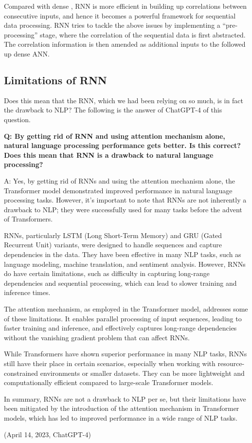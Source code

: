 Compared with dense , RNN is more efficient in building up correlations between consecutive inputs, and hence it becomes a powerful framework for sequential data processing. RNN tries to tackle the above issues by implementing a ``pre-processing'' stage, where the correlation of the sequential data is first abstracted. The correlation information is then amended as additional inputs to the followed up dense ANN.

\subsection{Limitations of RNN}



Does this mean that the RNN, which we had been relying on so much, is in fact the drawback to NLP? The following is the answer of ChatGPT-4 of this question.

\begin{mdframed}
	\textbf{Q: By getting rid of RNN and using attention mechanism alone, natural language processing performance gets better. Is this correct? Does this mean that RNN is a drawback to natural language processing?}
	
	A: Yes, by getting rid of RNNs and using the attention mechanism alone, the Transformer model demonstrated improved performance in natural language processing tasks. However, it's important to note that RNNs are not inherently a drawback to NLP; they were successfully used for many tasks before the advent of Transformers.
	
	RNNs, particularly LSTM (Long Short-Term Memory) and GRU (Gated Recurrent Unit) variants, were designed to handle sequences and capture dependencies in the data. They have been effective in many NLP tasks, such as language modeling, machine translation, and sentiment analysis. However, RNNs do have certain limitations, such as difficulty in capturing long-range dependencies and sequential processing, which can lead to slower training and inference times.
	
	The attention mechanism, as employed in the Transformer model, addresses some of these limitations. It enables parallel processing of input sequences, leading to faster training and inference, and effectively captures long-range dependencies without the vanishing gradient problem that can affect RNNs.
	
	While Transformers have shown superior performance in many NLP tasks, RNNs still have their place in certain scenarios, especially when working with resource-constrained environments or smaller datasets. They can be more lightweight and computationally efficient compared to large-scale Transformer models.
	
	In summary, RNNs are not a drawback to NLP per se, but their limitations have been mitigated by the introduction of the attention mechanism in Transformer models, which has led to improved performance in a wide range of NLP tasks.
	
	(April 14, 2023, ChatGPT-4)
\end{mdframed}

